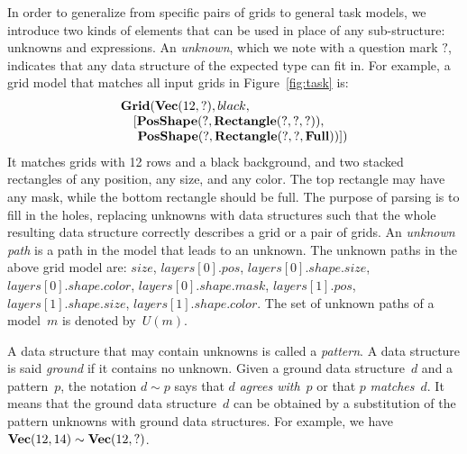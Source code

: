 \documentclass[a4paper]{llncs}
\begin{document}
In order to generalize from specific pairs of grids to general task
models, we introduce two kinds of elements that can be used in place
of any sub-structure: unknowns and expressions.
%
An {\em unknown}, which we note with a question mark $?$, indicates
that any data structure of the expected type can fit in. For example,
a grid model that matches all input grids in Figure~\ref{fig:task} is:
\[\begin{array}{l}
    {\bf Grid}({\bf Vec}(12,?), black,\\
    \quad [{\bf PosShape}(?, {\bf Rectangle}(?, ?, ?)),\\
    \quad ~{\bf PosShape}(?, {\bf Rectangle}(?, ?, {\bf Full}))])
  \end{array}\]
%
It matches grids with 12 rows and a black background, and two stacked
rectangles of any position, any size, and any color. The top rectangle
may have any mask, while the bottom rectangle should be full. The
purpose of parsing is to fill in the holes, replacing unknowns with
data structures such that the whole resulting data structure correctly
describes a grid or a pair of grids.
%
An {\em unknown path} is a path in the model that leads to an
unknown. The unknown paths in the above grid model are: $size$,
$layers[0].pos$, $layers[0].shape.size$, $layers[0].shape.color$,
$layers[0].shape.mask$, $layers[1].pos$, $layers[1].shape.size$,
$layers[1].shape.color$. The set of unknown paths of a model~$m$ is
denoted by~$U(m)$.

A data structure that may contain unknowns is called a {\em
  pattern}. A data structure is said {\em ground} if it contains no
unknown. Given a ground data structure~$d$ and a pattern~$p$, the
notation $d \sim p$ says that $d$ {\em agrees with}~$p$ or that $p$
{\em matches}~$d$. It means that the ground data structure~$d$ can be
obtained by a substitution of the pattern unknowns with ground data
structures. For example, we have
${\bf Vec}(12,14) \sim {\bf Vec}(12,?)$.
\end{document}
